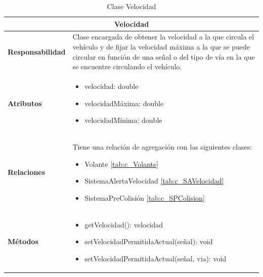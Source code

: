 \begin{table}[H]
\begin{center}
\begin{tabular}{p{} p{11cm}}
\multicolumn{2}{c}{\textbf{Velocidad} } \\ \hline \hline
\textbf{Responsabilidad} &  Clase encargada de obtener la velocidad a la que circula el vehículo y de fijar la velocidad máxima a la que se puede circular en función de una señal o del tipo de vía en la que se encuentre circulando el vehículo.  \\ \hline
\textbf{Atributos} & \begin{itemize}
                      \item velocidad: double
                      \item velocidadMáxima: double
                      \item velocidadMínima: double

                    \end{itemize}\\ \hline
\textbf{Relaciones} &

                      \par Tiene una relación de agregación con las siguientes clases:
                      \begin{itemize}
                        \item Volante \ref{tab:c_Volante}
                        \item SistemaAlertaVelocidad \ref{tab:c_SAVelocidad}
                        \item SistemaPreColisión \ref{tab:c_SPColision}
                      \end{itemize}



                      \\ \hline

\textbf{Métodos} &  \begin{itemize}
                      \item getVelocidad(): velocidad
                      \item setVelocidadPermitidaActual(señal): void
                      \item setVelocidadPermitidaActual(señal, via): void
                    \end{itemize}\\ \hline
\end{tabular}
\caption{Clase Velocidad}
\label{tab:c_velocidad}
\end{center}
\end{table}












